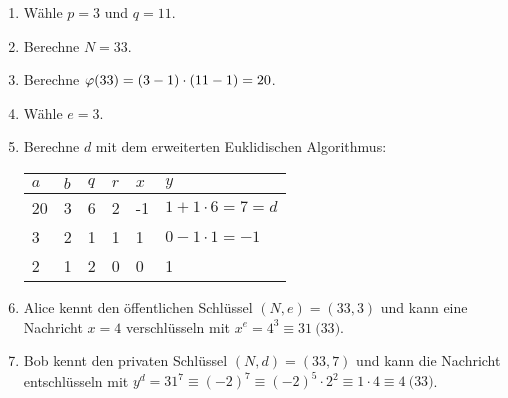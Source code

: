 \begin{example}\mbox{}
  \begin{enumerate}
    \item Wähle $p = 3$ und $q = 11$.
    \item Berechne $N = 33$.
    \item Berechne $\varphi(33) = (3 - 1) \cdot (11 - 1) = 20$.
    \item Wähle $e = 3$.
    \item Berechne $d$ mit dem erweiterten Euklidischen Algorithmus:
          \begin{center}
            \begin{tabular}{|l|l|l|l|l|l|}
              \hline
              $a$ & $b$ & $q$ & $r$ & $x$ & $y$                     \\ \hline
              20  & 3   & 6   & 2   & -1  & $1 + 1 \cdot 6 = 7 = d$ \\ \hline
              3   & 2   & 1   & 1   & 1   & $0 - 1 \cdot 1 = -1$    \\ \hline
              2   & 1   & 2   & 0   & 0   & 1                       \\ \hline
            \end{tabular}
          \end{center}
    \item Alice kennt den öffentlichen Schlüssel $(N,e) = (33,3)$ und kann eine
          Nachricht $x = 4$ verschlüsseln mit $x^e = 4^3 \equiv 31 \pod{33}$.
    \item Bob kennt den privaten Schlüssel $(N,d) = (33,7)$ und kann die Nachricht
          entschlüsseln mit $y^d = 31^7 \equiv (-2)^7 \equiv (-2)^5 \cdot 2^2 \equiv
            1 \cdot 4 \equiv 4 \pod{33}$. \qedhere
  \end{enumerate}
\end{example}